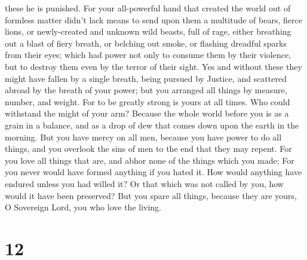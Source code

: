 these he is punished.  For your all-powerful hand that
created the world out of formless matter didn't lack means to send upon
them a multitude of bears, fierce lions,  or newly-created
and unknown wild beasts, full of rage, either breathing out a blast of
fiery breath, or belching out smoke, or flashing dreadful sparks from
their eyes;  which had power not only to consume them by
their violence, but to destroy them even by the terror of their sight.
 Yes and without these they might have fallen by a single
breath, being pursued by Justice, and scattered abroad by the breath of
your power; but you arranged all things by measure, number, and weight.
 For to be greatly strong is yours at all times. Who could
withstand the might of your arm?  Because the whole world
before you is as a grain in a balance, and as a drop of dew that comes
down upon the earth in the morning.  But you have mercy on
all men, because you have power to do all things, and you overlook the
sins of men to the end that they may repent.  For you love
all things that are, and abhor none of the things which you made; For
you never would have formed anything if you hated it.  How
would anything have endured unless you had willed it? Or that which was
not called by you, how would it have been preserved?  But
you spare all things, because they are yours, O Sovereign Lord, you who
love the living.

\hypertarget{section-8}{%
\section{12}\label{section-8}}

